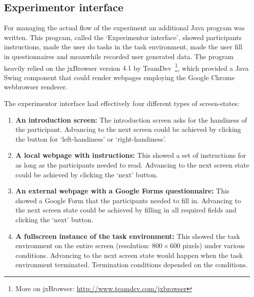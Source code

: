 \subsection{Experimentor interface}

For managing the actual flow of the experiment an additional Java program was written. This program, called the `Experimentor interface', showed participants instructions, made the user do tasks in the task environment, made the user fill in questionnaires and meanwhile recorded user generated data. The program heavily relied on the jxBrowser version $4.1$ by TeamDev~\footnote{More on jxBrowser: \url{http://www.teamdev.com/jxbrowser}}, which provided a Java Swing component that could render webpages employing the Google Chrome webbrowser renderer. 

The experimentor interface had effectively four different types of screen-states:
\begin{enumerate}
	\item{\textbf{An introduction screen:}} The introduction screen asks for the handiness of the participant. Advancing to the next screen could be achieved by clicking the button for `left-handiness' or `right-handiness'. 
	\item{\textbf{A local webpage with instructions:}} This showed a set of instructions for as long as the participants needed to read. Advancing to the next screen state could be achieved by clicking the `next' button. 
	\item{\textbf{An external webpage with a Google Forms questionnaire:}} This showed a Google Form that the participants needed to fill in. Advancing to the next screen state could be achieved by filling in all required fields and clicking the `next' button.
	\item{\textbf{A fullscreen instance of the task environment:}} This showed the task environment on the entire screen (resolution: $800 \times 600$ pixels) under various conditions. Advancing to the next screen state would happen when the task environment terminated. Termination conditions depended on the conditions.
\end{enumerate}

